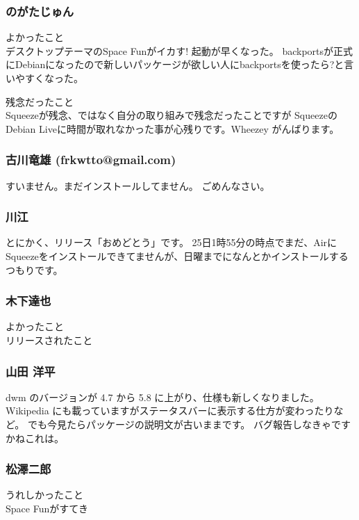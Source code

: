 \documentclass[cjk,dvipdfmx,12pt,%
hyperref={bookmarks=true,bookmarksnumbered=true,bookmarksopen=false,%
colorlinks=false,%
pdftitle={第 44 回 関西 Debian 勉強会},%
pdfauthor={倉敷・のがた・佐々木},%
pdfsubject={資料},%
}]{beamer}
\begin{document}
\begin{frame}[fragile]
  \frametitle{ のがたじゅん }
    \begin{description}
  \item {よかったこと} \\
    デスクトップテーマのSpace Funがイカす!
    起動が早くなった。
    backportsが正式にDebianになったので新しいパッケージが欲しい人にbackportsを使ったら?と言いやすくなった。
  \item {残念だったこと} \\
    Squeezeが残念、ではなく自分の取り組みで残念だったことですが
    SqueezeのDebian Liveに時間が取れなかった事が心残りです。Wheezey
    がんばります。
  \end{description}
\end{frame}

\begin{frame}[fragile]
  \frametitle{ 古川竜雄 (frkwtto@gmail.com) }
  すいません。まだインストールしてません。
  ごめんなさい。
\end{frame}

\begin{frame}[fragile]
  \frametitle{ 川江 }
  とにかく、リリース「おめどとう」です。
  25日1時55分の時点でまだ、AirにSqueezeをインストールできてませんが、日曜までになんとかインストールするつもりです。
\end{frame}

\begin{frame}[fragile]
  \frametitle{ 木下達也 }
  \begin{description}
  \item {よかったこと} \\
    リリースされたこと
  \end{description}
\end{frame}

\begin{frame}[fragile]
  \frametitle{ 山田 洋平 }
  dwm のバージョンが 4.7 から 5.8 に上がり、仕様も新しくなりました。
  Wikipedia にも載っていますがステータスバーに表示する仕方が変わったりなど。
  でも今見たらパッケージの説明文が古いままです。
  バグ報告しなきゃですかねこれは。
\end{frame}

\begin{frame}[fragile]
  \frametitle{ 松澤二郎}
  \begin{description}
  \item {うれしかったこと} \\
    Space Funがすてき
  \end{description}
\end{frame}
\end{document}
